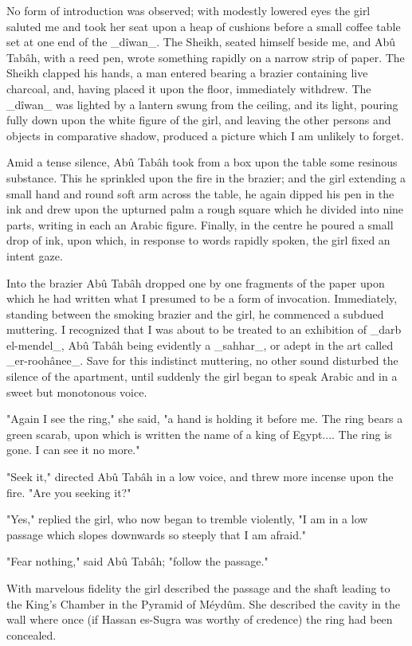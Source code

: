 No form of introduction was observed; with modestly lowered eyes the
girl saluted me and took her seat upon a heap of cushions before a
small coffee table set at one end of the _dîwan_. The Sheikh, seated
himself beside me, and Abû Tabâh, with a reed pen, wrote something
rapidly on a narrow strip of paper. The Sheikh clapped his hands, a
man entered bearing a brazier containing live charcoal, and, having
placed it upon the floor, immediately withdrew. The _dîwan_ was
lighted by a lantern swung from the ceiling, and its light, pouring
fully down upon the white figure of the girl, and leaving the other
persons and objects in comparative shadow, produced a picture which
I am unlikely to forget.

Amid a tense silence, Abû Tabâh took from a box upon the table some
resinous substance. This he sprinkled upon the fire in the brazier;
and the girl extending a small hand and round soft arm across the
table, he again dipped his pen in the ink and drew upon the upturned
palm a rough square which he divided into nine parts, writing in each
an Arabic figure. Finally, in the centre he poured a small drop of
ink, upon which, in response to words rapidly spoken, the girl fixed
an intent gaze.

Into the brazier Abû Tabâh dropped one by one fragments of the paper
upon which he had written what I presumed to be a form of invocation.
Immediately, standing between the smoking brazier and the girl, he
commenced a subdued muttering. I recognized that I was about to be
treated to an exhibition of _darb el-mendel_, Abû Tabâh being
evidently a _sahhar_, or adept in the art called _er-roohânee_. Save
for this indistinct muttering, no other sound disturbed the silence of
the apartment, until suddenly the girl began to speak Arabic and in a
sweet but monotonous voice.

"Again I see the ring," she said, "a hand is holding it before me.
The ring bears a green scarab, upon which is written the name of a
king of Egypt.... The ring is gone. I can see it no more."

"Seek it," directed Abû Tabâh in a low voice, and threw more incense
upon the fire. "Are you seeking it?"

"Yes," replied the girl, who now began to tremble violently, "I am in
a low passage which slopes downwards so steeply that I am afraid."

"Fear nothing," said Abû Tabâh; "follow the passage."

With marvelous fidelity the girl described the passage and the shaft
leading to the King's Chamber in the Pyramid of Méydûm. She described
the cavity in the wall where once (if Hassan es-Sugra was worthy of
credence) the ring had been concealed.

